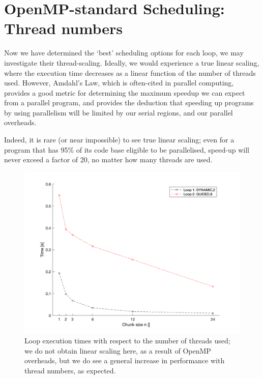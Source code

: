 \documentclass{article} %
\begin{document}
\section*{OpenMP-standard Scheduling: Thread numbers}

Now we have determined the `best' scheduling options for each loop, we may investigate their thread-scaling.
Ideally, we would experience a true linear scaling, where the execution time decreases as a linear function of the number of threads used.
However, Amdahl's Law, which is often-cited in parallel computing, provides a good metric for determining the maximum speedup we can expect from a parallel program, and provides the deduction that speeding up programs by using parallelism will be limited by our serial regions, and our parallel overheads. 

Indeed, it is rare (or near impossible) to see true linear scaling; even for a program that has 95\% of its code base eligible to be parallelised, speed-up will never exceed a factor of 20, no matter how many threads are used.

\begin{figure}
    \centering
    \includegraphics[height=.35\textheight]{part1_plots/bestruns_all}
    \caption{Loop execution times with respect to the number of threads used; we do not obtain linear scaling here, as a result of OpenMP overheads, but we do see a general increase in performance with thread numbers, as expected.}
    \label{fig:threadall}
\end{figure}
\end{document}

